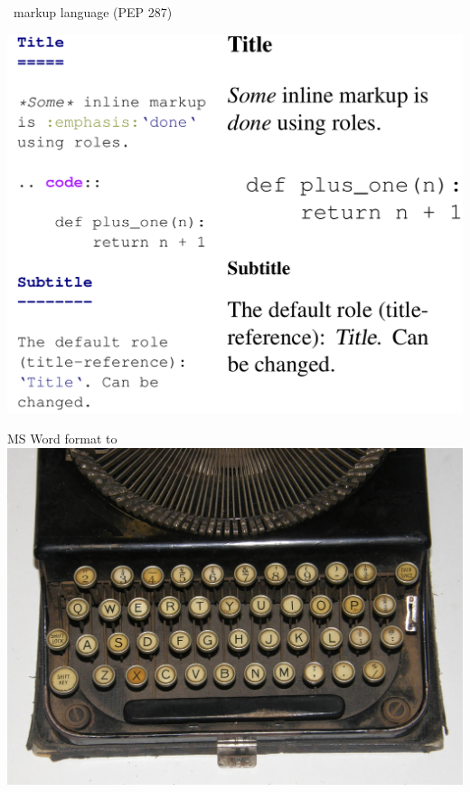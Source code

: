 \documentclass{beamer}
\begin{document}
\begin{frame}{\rst\ markup language (PEP 287)}
\centerline{\includegraphics[keepaspectratio=true, width=\paperwidth, height=0.9\paperheight]{rst_example.png}}
\end{frame}

\begin{frame}{MS Word format to \rst}
    \includegraphics[keepaspectratio=true, width=\paperwidth]{typewriter_keyboard.jpg}
\end{frame}
\end{document}
